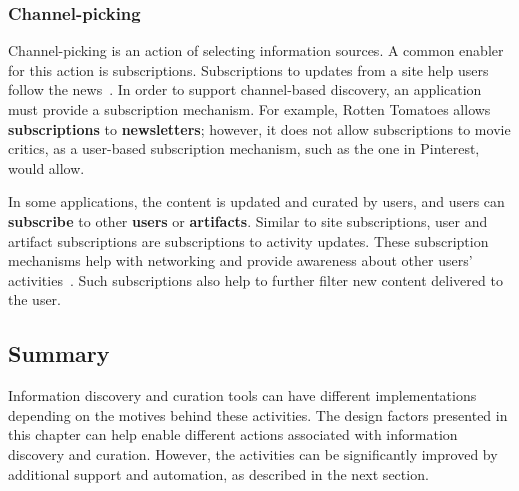 {{{\subsubsection{Channel-picking}

Channel-picking is an action of selecting information sources. A common enabler for this action is subscriptions. Subscriptions to updates from a site help users follow the news~\cite{java2007feeds}. In order to support channel-based discovery, an application must provide a subscription mechanism. For example, Rotten Tomatoes allows \textbf{subscriptions} to \textbf{newsletters}; however, it does not allow subscriptions to movie critics, as a user-based subscription mechanism, such as the one in Pinterest, would allow. 

In some applications, the content is updated and curated by users, and users can \textbf{subscribe} to other \textbf{users} or \textbf{artifacts}. Similar to site subscriptions, user and artifact subscriptions are subscriptions to activity updates. These subscription mechanisms help with networking and provide awareness about other users' activities~\cite{millen2005social}. Such subscriptions also help to further filter new content delivered to the user. 
} %
} %

{\subsection{Summary}
Information discovery and curation tools can have different implementations depending on the motives behind these activities. The design factors presented in this chapter can help enable different actions associated with information discovery and curation. However, the activities can be significantly improved by additional support and automation, as described in the next section.
}
} %

